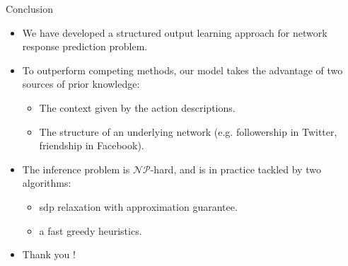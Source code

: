 \documentclass[first=dgreen,second=purple,logo=yellowexc]{aaltoslides}
\begin{document}
\begin{frame}{Conclusion}
	\begin{itemize}
		\item We have developed a structured output learning approach for network response prediction problem.
		\item To outperform competing methods, our model takes the advantage of two sources of prior knowledge:
		\begin{itemize}
			\item The context given by the action descriptions.
			\item The structure of an underlying network (e.g. followership in Twitter, friendship in Facebook).
		\end{itemize}
		\item The inference problem is $\mathcal{NP}$-hard, and is in practice tackled by two algorithms:
		\begin{itemize}
			\item {\sc sdp} relaxation with approximation guarantee.
			\item a fast {\sc greedy} heuristics.
		\end{itemize}
	\end{itemize}
\end{frame}

\begin{frame}{}
	
	\begin{itemize}
		\item Thank you !
	\end{itemize}
\end{frame}

\end{document}
